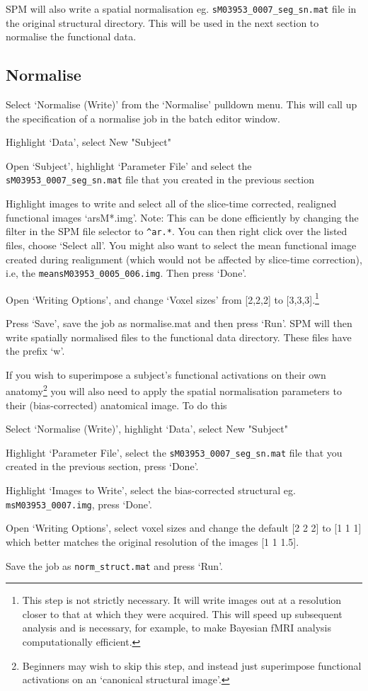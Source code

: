 SPM will also write a spatial normalisation eg. 
\verb!sM03953_0007_seg_sn.mat! file in the 
original structural directory. This will be used 
in the next section to normalise the functional data. 


\subsection{Normalise}

Select `Normalise (Write)' from the `Normalise' pulldown menu. This will call up the specification of a normalise job in the batch editor 
window. 

\bi
\item{Highlight `Data', select New "Subject"}
\item{Open `Subject', highlight `Parameter File' and 
select the \verb!sM03953_0007_seg_sn.mat! file that you 
created in the previous section}
\item{Highlight images to write and select all of the 
slice-time corrected, realigned functional images `arsM*.img'. Note: This can be done efficiently by changing the filter in the SPM file selector to \verb!^ar.*!. You can then right click over the listed files, choose `Select all'. You might also want to select the mean functional image created during realignment (which would not be affected by slice-time correction), i.e, the \verb!meansM03953_0005_006.img!. Then press `Done'.}
\item{Open `Writing Options', and change `Voxel sizes' from [2,2,2] to [3,3,3].\footnote{This step is not 
strictly necessary. It will write images out at 
a resolution closer to that at which they were acquired. 
This will speed up subsequent analysis and is necessary, for example, to make Bayesian fMRI analysis computationally efficient.}}
\item{Press `Save', save the job as normalise.mat and then
press `Run'.}
\ei
SPM will then write spatially normalised files to the 
functional data directory. These files have the prefix `w'.

If you wish to superimpose a subject's functional activations on their own anatomy\footnote{Beginners may wish to skip this step, and instead just superimpose functional activations on an `canonical structural image'.} you will also need to 
apply the spatial normalisation parameters to their 
(bias-corrected) anatomical image. To do this
\bi
\item{Select `Normalise (Write)', highlight `Data', select 
New "Subject"}
\item{Highlight `Parameter File', select the  \verb!sM03953_0007_seg_sn.mat! file that you 
created in the previous section, press `Done'.}
\item{Highlight `Images to Write', select the 
bias-corrected structural eg. \verb!msM03953_0007.img!, press `Done'.}
\item{Open `Writing Options', select voxel sizes and 
change the default [2 2 2] to [1 1 1] which better matches the original resolution of the images [1 1 1.5].}
\item{Save the job as \verb!norm_struct.mat! and press `Run'}.
\ei

